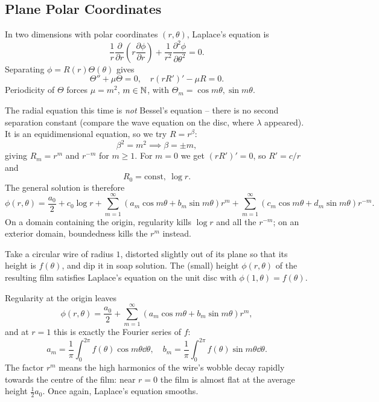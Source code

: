 \documentclass[a4paper]{scrartcl}
\begin{document}
\subsection{Plane Polar Coordinates}

In two dimensions with polar coordinates $(r, \theta)$, Laplace's equation is
$$
\frac{1}{r}\frac{\partial}{\partial r}\left(r \frac{\partial \phi}{\partial r}\right) + \frac{1}{r^2}\frac{\partial^2 \phi}{\partial \theta^2} = 0.
$$
Separating $\phi = R(r) \Theta(\theta)$ gives
$$
\Theta'' + \mu \Theta = 0, \quad r (r R')' - \mu R = 0.
$$
Periodicity of $\Theta$ forces $\mu = m^2$, $m \in \mathbb{N}$, with $\Theta_m = \cos m \theta, \sin m \theta$.

The radial equation this time is \emph{not} Bessel's equation -- there is no second separation constant (compare the wave equation on the disc, where $\lambda$ appeared). It is an equidimensional equation, so we try $R = r^\beta$:
$$
\beta^2 = m^2 \implies \beta = \pm m,
$$
giving $R_m = r^m$ and $r^{-m}$ for $m \geq 1$. For $m = 0$ we get $(rR')' = 0$, so $R' = c/r$ and
$$
R_0 = \text{const}, \ \log r.
$$
The general solution is therefore
$$
\phi(r, \theta) = \frac{a_0}{2} + c_0 \log r + \sum_{m = 1}^{\infty} (a_m \cos m \theta + b_m \sin m \theta) r^m + \sum_{m = 1}^{\infty} (c_m \cos m \theta + d_m \sin m \theta) r^{-m}.
$$
On a domain containing the origin, regularity kills $\log r$ and all the $r^{-m}$; on an exterior domain, boundedness kills the $r^m$ instead.

\begin{example}
    Take a circular wire of radius $1$, distorted slightly out of its plane so that its height is $f(\theta)$, and dip it in soap solution. The (small) height $\phi(r, \theta)$ of the resulting film satisfies Laplace's equation on the unit disc with $\phi(1, \theta) = f(\theta)$.

    Regularity at the origin leaves
    $$
    \phi(r, \theta) = \frac{a_0}{2} + \sum_{m = 1}^{\infty}\left(a_m \cos m \theta + b_m \sin m\theta\right) r^m,
    $$
    and at $r = 1$ this is exactly the Fourier series of $f$:
    $$
    a_m = \frac{1}{\pi} \int_0^{2 \pi} f(\theta) \cos m \theta \dd \theta, \quad b_m = \frac{1}{\pi} \int_0^{2\pi} f(\theta) \sin m \theta \dd \theta.
    $$
    The factor $r^m$ means the high harmonics of the wire's wobble decay rapidly towards the centre of the film: near $r = 0$ the film is almost flat at the average height $\frac{1}{2}a_0$. Once again, Laplace's equation smooths.
\end{example}
\end{document}
